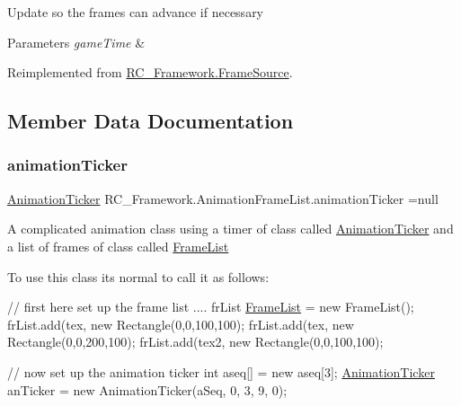 Update so the frames can advance if necessary 


\begin{DoxyParams}{Parameters}
{\em game\+Time} & \\
\hline
\end{DoxyParams}


Reimplemented from \mbox{\hyperlink{class_r_c___framework_1_1_frame_source_a4ab94513c0555c16316b540aed1e9144}{R\+C\+\_\+\+Framework.\+Frame\+Source}}.



\subsection{Member Data Documentation}
\mbox{\label{class_r_c___framework_1_1_animation_frame_list_a41409ce75f3131d7008e249296cb95a6}} 
\subsubsection{\texorpdfstring{animation\+Ticker}{animationTicker}}
{\footnotesize\ttfamily \mbox{\hyperlink{class_r_c___framework_1_1_animation_ticker}{Animation\+Ticker}} R\+C\+\_\+\+Framework.\+Animation\+Frame\+List.\+animation\+Ticker =null}



A complicated animation class using a timer of class called \mbox{\hyperlink{class_r_c___framework_1_1_animation_ticker}{Animation\+Ticker}} and a list of frames of class called \mbox{\hyperlink{class_r_c___framework_1_1_frame_list}{Frame\+List}} 

To use this class its normal to call it as follows\+:

// first here set up the frame list .... fr\+List \mbox{\hyperlink{class_r_c___framework_1_1_frame_list}{Frame\+List}} = new Frame\+List(); fr\+List.\+add(tex, new Rectangle(0,0,100,100); fr\+List.\+add(tex, new Rectangle(0,0,200,100); fr\+List.\+add(tex2, new Rectangle(0,0,100,100);

// now set up the animation ticker int aseq\mbox{[}\mbox{]} = new aseq\mbox{[}3\mbox{]}; \mbox{\hyperlink{class_r_c___framework_1_1_animation_ticker}{Animation\+Ticker}} an\+Ticker = new Animation\+Ticker(a\+Seq, 0, 3, 9, 0);

